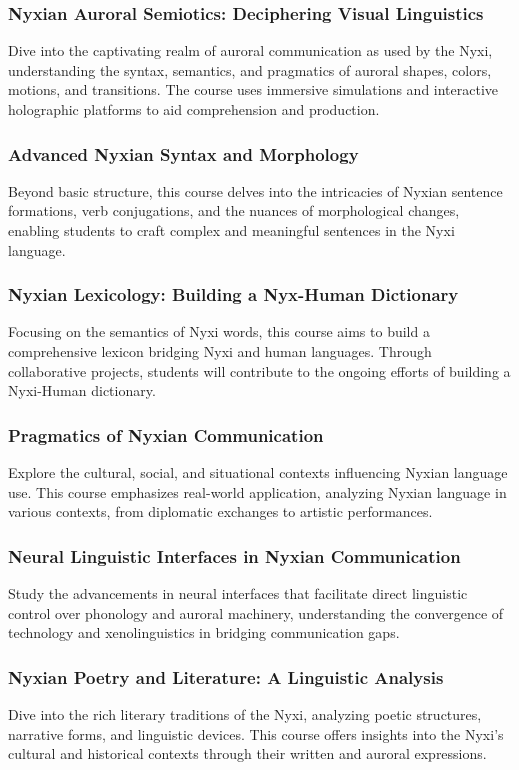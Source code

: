 \subsubsection{Nyxian Auroral Semiotics: Deciphering Visual Linguistics}
Dive into the captivating realm of auroral communication as used by the Nyxi, understanding the syntax, semantics, and pragmatics of auroral shapes, colors, motions, and transitions. The course uses immersive simulations and interactive holographic platforms to aid comprehension and production.
\subsubsection{Advanced Nyxian Syntax and Morphology}
Beyond basic structure, this course delves into the intricacies of Nyxian sentence formations, verb conjugations, and the nuances of morphological changes, enabling students to craft complex and meaningful sentences in the Nyxi language.
\subsubsection{Nyxian Lexicology: Building a Nyx-Human Dictionary}
Focusing on the semantics of Nyxi words, this course aims to build a comprehensive lexicon bridging Nyxi and human languages. Through collaborative projects, students will contribute to the ongoing efforts of building a Nyxi-Human dictionary.
\subsubsection{Pragmatics of Nyxian Communication}
Explore the cultural, social, and situational contexts influencing Nyxian language use. This course emphasizes real-world application, analyzing Nyxian language in various contexts, from diplomatic exchanges to artistic performances.
\subsubsection{Neural Linguistic Interfaces in Nyxian Communication}
Study the advancements in neural interfaces that facilitate direct linguistic control over phonology and auroral machinery, understanding the convergence of technology and xenolinguistics in bridging communication gaps.
\subsubsection{Nyxian Poetry and Literature: A Linguistic Analysis}
Dive into the rich literary traditions of the Nyxi, analyzing poetic structures, narrative forms, and linguistic devices. This course offers insights into the Nyxi's cultural and historical contexts through their written and auroral expressions.
